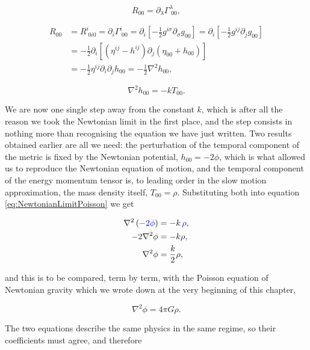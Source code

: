 \begin{equation}
    R_{00}=\partial_{\lambda}\Gamma^{\lambda}_{\;00},
\end{equation}

\begin{align}
    R_{00} &= R^i_{\;0i0}=\partial_i\Gamma^i_{\;00} = \partial_i\left[-\frac{1}{2}g^{i\sigma}\partial_{\sigma}g_{00} \right] = \partial_i\left[-\frac{1}{2}g^{ij}\partial_jg_{00} \right]\\
    &=-\frac{1}{2}\partial_i\left[\left(\eta^{ij}-h^{ij} \right)\partial_j\left(\eta_{00}+h_{00} \right) \right]\\
    &= -\frac{1}{2}\eta^{ij}\partial_i\partial_jh_{00}=-\frac{1}{2}\nabla^2h_{00},
\end{align}

\begin{equation}\label{eq:NewtonianLimitPoisson}
    \nabla^2h_{00}=-kT_{00}.
\end{equation}

We are now one single step away from the constant $k$, which is after all the reason we took the Newtonian limit in the first place, and the step consists in nothing more than recognising the equation we have just written. Two results obtained earlier are all we need: the perturbation of the temporal component of the metric is fixed by the Newtonian potential, $h_{00} = -2\phi$, which is what allowed us to reproduce the Newtonian equation of motion, and the temporal component of the energy momentum tensor is, to leading order in the slow motion approximation, the mass density itself, $T_{00}=\rho$. Substituting both into equation \ref{eq:NewtonianLimitPoisson} we get

\begin{align*}
    \nabla^2\left({\color{blue}-2\phi}\right) &= -k\,{\color{blue}\rho},\\
    -2\nabla^2\phi &= -k\rho,\\
    \nabla^2\phi &= \frac{k}{2}\rho,
\end{align*}

and this is to be compared, term by term, with the Poisson equation of Newtonian gravity which we wrote down at the very beginning of this chapter,

\begin{equation}
    \nabla^2\phi = 4\pi G\rho.
\end{equation}

The two equations describe the same physics in the same regime, so their coefficients must agree, and therefore

